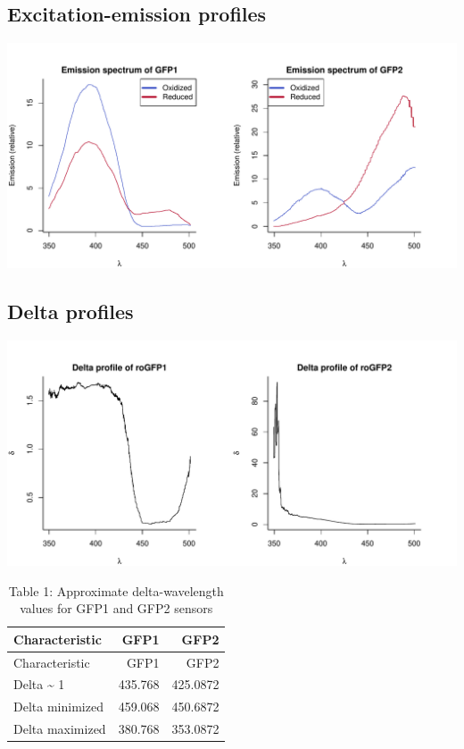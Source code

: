 \documentclass[]{article}
\title{}
\author{}
\date{}
\begin{document}
\subsection{Excitation-emission
profiles}\label{excitation-emission-profiles}

\begin{center}\includegraphics{Comparison_roGFP1_roGFP2_files/figure-latex/Plot spectra-1} \end{center}

\subsection{Delta profiles}\label{delta-profiles}

\begin{center}\includegraphics{Comparison_roGFP1_roGFP2_files/figure-latex/Plot deltas-1} \end{center}

\begin{longtable}[]{@{}lrr@{}}
\caption{Table 1: Approximate delta-wavelength values for GFP1 and GFP2
sensors}\tabularnewline
\toprule
Characteristic & GFP1 & GFP2\tabularnewline
\midrule
\endfirsthead
\toprule
Characteristic & GFP1 & GFP2\tabularnewline
\midrule
\endhead
Delta \textasciitilde{} 1 & 435.768 & 425.0872\tabularnewline
Delta minimized & 459.068 & 450.6872\tabularnewline
Delta maximized & 380.768 & 353.0872\tabularnewline
\bottomrule
\end{longtable}
\end{document}
